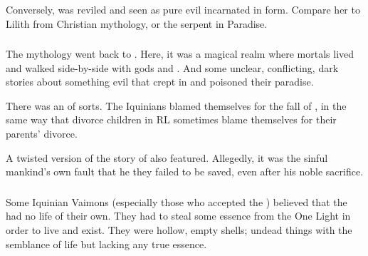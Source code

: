Conversely,  was reviled and seen as pure evil incarnated in \human form. 
Compare her to Lilith from Christian mythology, or the serpent in Paradise.





\subsubsection[Merkyrah]{\Merkyrah}
The \Iquinian{} mythology went back to \Merkyrah. 
Here, it was a magical realm where mortals lived and walked side-by-side with gods and . 
And some unclear, conflicting, dark stories about something evil that crept in and poisoned their paradise. 

There was an  of sorts. 
The Iquinians blamed themselves for the fall of \Merkyrah, in the same way that divorce children in RL sometimes blame themselves for their parents' divorce. 

A twisted version of the story of  also featured. 
Allegedly, it was the sinful mankind's own fault that he they failed to be saved, even after his noble sacrifice. 






\subsubsection{\Qliphoth}
Some Iquinian Vaimons (especially those who accepted the ) believed that the \qliphoth had no life of their own.
They had to steal some essence from the One Light in order to live and exist. 
They were hollow, empty shells; undead things with the semblance of life but lacking any true essence. 

